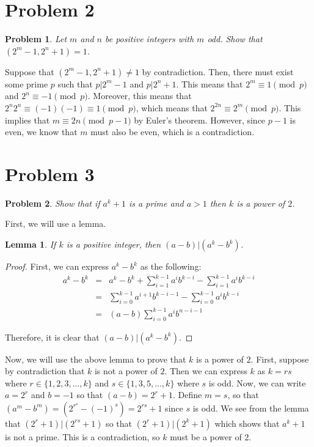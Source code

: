 \documentclass[psamsfonts]{amsart}
\newtheorem{prob}{Problem}[section]
\newtheorem{lem}[thm]{Lemma}
\newenvironment{sol}{{\bfseries Solution}}{\qedsymbol}
\theoremstyle{definition}
\theoremstyle{remark}
\numberwithin{equation}{section}
\begin{document}
\section{Problem 2}

\begin{prob}
Let $m$ and $n$ be positive integers with $m$ odd. Show that $(2^m - 1, 2^n+1) = 1$. 
\end{prob}

\begin{sol}
Suppose that $(2^m - 1, 2^n + 1) \neq 1$ by contradiction. Then, there must exist some prime $p$ such that $p | 2^m - 1$ and $p | 2^n + 1$. This means that $2^m \equiv 1 \pmod{p}$ and $2^n \equiv - 1 \pmod{p}$. Moreover, this means that $2^{n} 2^{n} \equiv (-1) (-1) \equiv 1 \pmod{p}$, which means that $2^{2n} \equiv 2^{m} \pmod{p}$. This implies that $m \equiv 2n \pmod{p-1}$ by Euler's theorem. However, since $p-1$ is even, we know that $m$ must also be even, which is a contradiction.
\end{sol}

\section{Problem 3}
\begin{prob}
Show that if $a^k + 1$ is a prime and $a > 1$ then $k$ is a power of $2$. 
\end{prob}

\begin{sol}
First, we will use a lemma.
\begin{lem}
If $k$ is a positive integer, then $(a-b) | (a^k - b^k)$.
\end{lem}

\begin{proof}
First, we can express $a^k - b^k$ as the following:
\begin{eqnarray}
a^k - b^k &=& a^k - b^k + \sum_{i=1}^{k-1} a^i b^{k - i} - \sum_{i=1}^{k-1} a^i b^{k - i} \\
&=& \sum_{i=0}^{k-1} a^{i+1} b^{k-i-1} - \sum_{i=0}^{k-1} a^i b^{k - i} \\
&=& (a - b) \sum_{i=0}^{k-1} a^{i} b^{n - i - 1}
\end{eqnarray}

Therefore, it is clear that $(a-b) | (a^k - b^k)$. 
\end{proof}

Now, we will use the above lemma to prove that $k$ is a power of $2$. First, suppose by contradiction that $k$ is not a power of $2$. Then we can express $k$ as $k = rs$ where $r \in \{1,2, 3, \ldots, k\}$ and $s \in \{1, 3, 5, \ldots, k\}$ where $s$ is odd. Now, we can write $a = 2^r$ and $b = -1$ so that $(a-b) = 2^r + 1$. Define $m = s$, so that $(a^m - b^m) = (2^{r^s} - (-1)^{s}) = 2^{rs} + 1$ since $s$ is odd. We see from the lemma that $(2^r + 1) | (2^{rs} + 1)$ so that $(2^r + 1 ) | (2^k + 1)$ which shows that $a^k + 1$ is not a prime. This is a contradiction, so $k$ must be a power of 2.
\end{sol}
\end{document}
